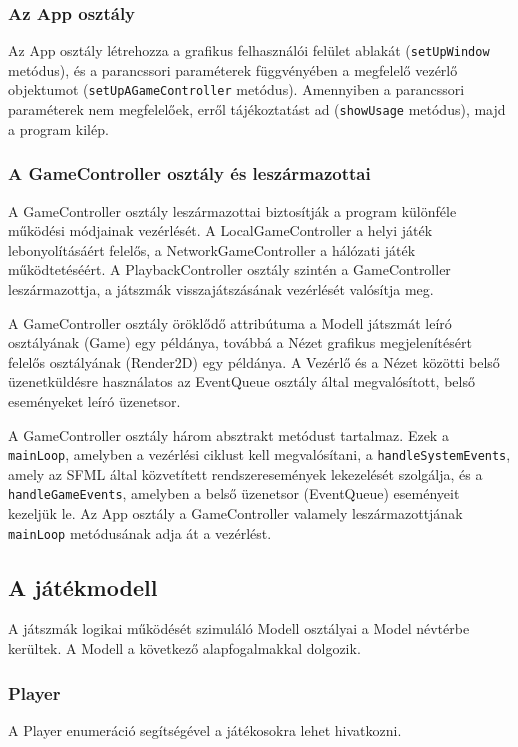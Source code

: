 \documentclass[12pt, twoside]{report}
\begin{document}
\subsubsection{Az App osztály}

Az App osztály létrehozza a grafikus felhasználói felület ablakát ({\tt setUpWindow} metódus), és a parancssori paraméterek függvényében a megfelelő vezérlő objektumot ({\tt setUpAGameController} metódus). Amennyiben a parancssori paraméterek nem megfelelőek, erről tájékoztatást ad ({\tt showUsage} metódus), majd a program kilép.

\subsubsection{A GameController osztály és leszármazottai}

A GameController osztály leszármazottai biztosítják a program különféle működési módjainak vezérlését. A LocalGameController a helyi játék lebonyolításáért felelős, a NetworkGameController a hálózati játék működtetéséért. A PlaybackController osztály szintén a GameController leszármazottja, a játszmák visszajátszásának vezérlését valósítja meg.

A GameController osztály öröklődő attribútuma a Modell játszmát leíró osztályának (Game) egy példánya, továbbá a Nézet grafikus megjelenítésért felelős osztályának (Render2D) egy példánya. A Vezérlő és a Nézet közötti belső üzenetküldésre használatos az EventQueue osztály által megvalósított, belső eseményeket leíró üzenetsor. 

A GameController osztály három absztrakt metódust tartalmaz. Ezek a {\tt mainLoop}, amelyben a vezérlési ciklust kell megvalósítani, a {\tt handleSystemEvents}, amely az SFML által közvetített rendszeresemények lekezelését szolgálja, és a {\tt handleGameEvents}, amelyben a belső üzenetsor (EventQueue) eseményeit kezeljük le. Az App osztály a GameController valamely leszármazottjának {\tt mainLoop} metódusának adja át a vezérlést.

\subsection {A játékmodell}

A játszmák logikai működését szimuláló Modell osztályai a Model névtérbe kerültek. A Modell a következő alapfogalmakkal dolgozik.

\subsubsection {Player}
A Player enumeráció segítségével a játékosokra lehet hivatkozni.
\end{document}
